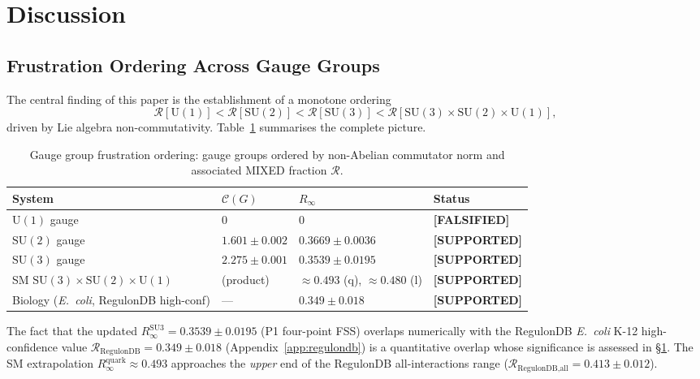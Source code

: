 \documentclass[12pt,a4paper]{article}
\newcommand{\R}{\mathcal{R}}           %
\newcommand{\SU}[1]{\mathrm{SU}(#1)}
\newcommand{\UN}[1]{\mathrm{U}(#1)}
\newcommand{\SM}{\SU{3}\!\times\!\SU{2}\!\times\!\UN{1}}
\newcommand{\supported}{\textcolor{blue!70!black}{\textbf{[SUPPORTED]}}}
\newcommand{\falsified}{\textcolor{red!70!black}{\textbf{[FALSIFIED]}}}
\theoremstyle{plain}
\theoremstyle{definition}
\theoremstyle{remark}
\begin{document}
\section{Discussion}
\label{sec:discussion}

\subsection{Frustration Ordering Across Gauge Groups}

The central finding of this paper is the establishment of a monotone ordering
\begin{equation}
  \R[\UN{1}] < \R[\SU{2}] < \R[\SU{3}] < \R[\SM],
  \label{eq:hierarchy}
\end{equation}
driven by Lie algebra non-commutativity.
Table~\ref{tab:hierarchy} summarises the complete picture.

\begin{table}[ht]
\centering
\caption{Gauge group frustration ordering: gauge groups ordered by non-Abelian commutator
norm and associated MIXED fraction $\R$.}
\label{tab:hierarchy}
\begin{tabular}{llll}
\toprule
System & $\mathcal{C}(G)$ & $R_\infty$ & Status \\
\midrule
$\UN{1}$ gauge         & 0              & $0$                   & \falsified{}  \\
$\SU{2}$ gauge         & $1.601\pm0.002$ & $0.3669\pm0.0036$      & \supported{}  \\
$\SU{3}$ gauge         & $2.275\pm0.001$ & $0.3539\pm0.0195$      & \supported{}  \\
SM $\SM$               & (product)      & $\approx0.493$ (q), $\approx0.480$ (l) & \supported{} \\
Biology (\textit{E.~coli}, RegulonDB high-conf) & --- & $0.349\pm0.018$  & \supported{} \\
\bottomrule
\end{tabular}
\end{table}

The fact that the updated $R_\infty^\text{SU3}=0.3539\pm0.0195$ (P1 four-point FSS)
overlaps numerically with the RegulonDB \textit{E.~coli} K-12 high-confidence value
$\R_\text{RegulonDB}=0.349\pm0.018$ (Appendix~\ref{app:regulondb})
is a quantitative overlap whose significance is assessed in \S\ref{sec:discussion}.
The SM extrapolation $R_\infty^\text{quark}\approx0.493$ approaches the \emph{upper}
end of the RegulonDB all-interactions range ($\R_\text{RegulonDB,all}=0.413\pm0.012$).
\end{document}

